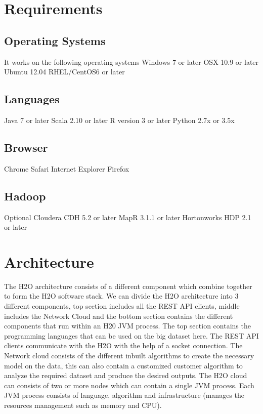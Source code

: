 \documentclass[9pt,twocolumn,twoside]{styles/osajnl}
\begin{document}
\section{Requirements}

\subsection{Operating Systems}
\cite{www-h2o-requirements}
It works on the following operating systems 
\newline Windows 7 or later
\newline OSX 10.9 or later
\newline Ubuntu 12.04
\newline RHEL/CentOS6 or later

\subsection{Languages}

 Java 7 or later
\newline Scala 2.10 or later
\newline R version 3 or later
\newline Python 2.7x or 3.5x
 
\subsection{Browser}

 Chrome
\newline Safari
\newline Internet Explorer
\newline Firefox

\subsection{Hadoop}
 Optional Cloudera CDH 5.2 or later
\newline MapR 3.1.1 or later
\newline Hortonworks HDP 2.1 or later

\section{Architecture}
\cite{www-h2o-architecture}
The H2O architecture consists of a different component which combine
together to form the H2O software stack. We can divide the H2O
architecture into 3 different components, top section includes all
the REST API clients, middle includes the Network Cloud and the
bottom section contains the different components that run within an
H20 JVM process. The top section contains the programming languages
that can be used on the big dataset here. The REST API clients
communicate with the H2O with the help of a socket connection. The
Network cloud consists of the different inbuilt algorithms to create
the necessary model on the data, this can also contain a customized
customer algorithm to analyze the required dataset and produce the
desired outputs.  The H2O cloud can consists of two or more nodes
which can contain a single JVM process. Each JVM process consists of
language, algorithm and infrastructure (manages the resources
management such as memory and CPU).
\end{document}

